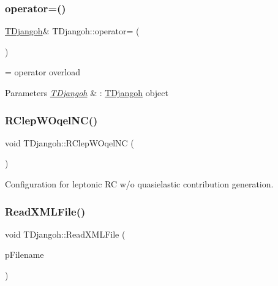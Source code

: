 \subsubsection{\texorpdfstring{operator=()}{operator=()}}
{\footnotesize\ttfamily \hyperlink{class_t_djangoh}{T\+Djangoh}\& T\+Djangoh\+::operator= (\begin{DoxyParamCaption}\item[{const \hyperlink{class_t_djangoh}{T\+Djangoh} \&}]{ }\end{DoxyParamCaption})\hspace{0.3cm}{\ttfamily [protected]}}



= operator overload 


\begin{DoxyParams}{Parameters}
{\em \hyperlink{class_t_djangoh}{T\+Djangoh}} & \+: \hyperlink{class_t_djangoh}{T\+Djangoh} object \\
\hline
\end{DoxyParams}
\mbox{\label{class_t_djangoh_a283b09ffc625a6a14af2f301ae957c92}} 
\subsubsection{\texorpdfstring{R\+Clep\+W\+Oqel\+N\+C()}{RClepWOqelNC()}}
{\footnotesize\ttfamily void T\+Djangoh\+::\+R\+Clep\+W\+Oqel\+NC (\begin{DoxyParamCaption}{ }\end{DoxyParamCaption})}



Configuration for leptonic RC w/o quasielastic contribution generation. 

\mbox{\label{class_t_djangoh_af6954bed103bc5adc60822f16268c12d}} 
\subsubsection{\texorpdfstring{Read\+X\+M\+L\+File()}{ReadXMLFile()}}
{\footnotesize\ttfamily void T\+Djangoh\+::\+Read\+X\+M\+L\+File (\begin{DoxyParamCaption}\item[{const string}]{p\+Filename }\end{DoxyParamCaption})}



